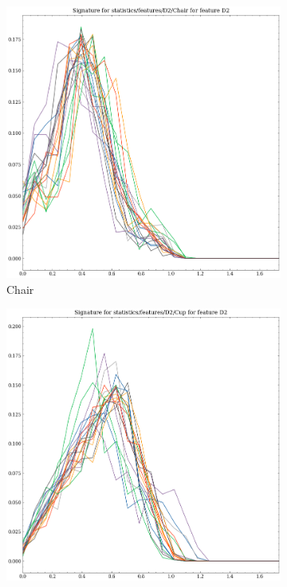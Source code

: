 \begin{figure}[t!p]
    
    \begin{subfigure}[b]{0.23\textwidth}
        \includegraphics[width=\textwidth]{assets/feature_extraction/D2/Chair.png}
        \caption{Chair}
    \end{subfigure}
    \hfill
    \begin{subfigure}[b]{0.23\textwidth}
        \includegraphics[width=\textwidth]{assets/feature_extraction/D2/Cup.png}

\end{subfigure}
\end{figure}

